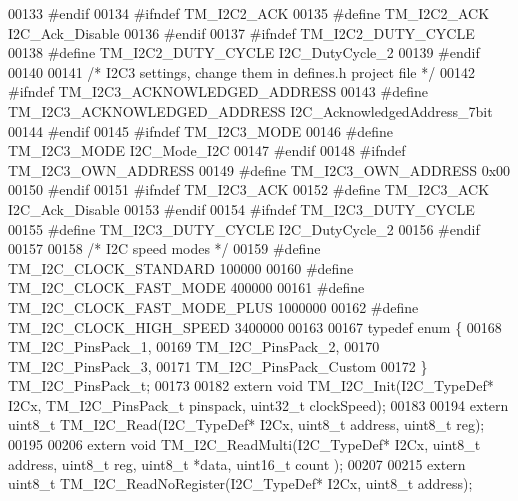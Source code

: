 \begin{DoxyCode}
00133 \textcolor{preprocessor}{#endif}
00134 \textcolor{preprocessor}{#ifndef TM\_I2C2\_ACK}
00135 \textcolor{preprocessor}{#define TM\_I2C2\_ACK                     I2C\_Ack\_Disable}
00136 \textcolor{preprocessor}{#endif}
00137 \textcolor{preprocessor}{#ifndef TM\_I2C2\_DUTY\_CYCLE}
00138 \textcolor{preprocessor}{#define TM\_I2C2\_DUTY\_CYCLE              I2C\_DutyCycle\_2}
00139 \textcolor{preprocessor}{#endif}
00140 
00141 \textcolor{comment}{/* I2C3 settings, change them in defines.h project file */}
00142 \textcolor{preprocessor}{#ifndef TM\_I2C3\_ACKNOWLEDGED\_ADDRESS}
00143 \textcolor{preprocessor}{#define TM\_I2C3\_ACKNOWLEDGED\_ADDRESS    I2C\_AcknowledgedAddress\_7bit}
00144 \textcolor{preprocessor}{#endif}
00145 \textcolor{preprocessor}{#ifndef TM\_I2C3\_MODE}
00146 \textcolor{preprocessor}{#define TM\_I2C3\_MODE                    I2C\_Mode\_I2C}
00147 \textcolor{preprocessor}{#endif}
00148 \textcolor{preprocessor}{#ifndef TM\_I2C3\_OWN\_ADDRESS}
00149 \textcolor{preprocessor}{#define TM\_I2C3\_OWN\_ADDRESS             0x00}
00150 \textcolor{preprocessor}{#endif}
00151 \textcolor{preprocessor}{#ifndef TM\_I2C3\_ACK}
00152 \textcolor{preprocessor}{#define TM\_I2C3\_ACK                     I2C\_Ack\_Disable}
00153 \textcolor{preprocessor}{#endif}
00154 \textcolor{preprocessor}{#ifndef TM\_I2C3\_DUTY\_CYCLE}
00155 \textcolor{preprocessor}{#define TM\_I2C3\_DUTY\_CYCLE              I2C\_DutyCycle\_2}
00156 \textcolor{preprocessor}{#endif}
00157 
00158 \textcolor{comment}{/* I2C speed modes */}
00159 \textcolor{preprocessor}{#define TM\_I2C\_CLOCK\_STANDARD           100000}
00160 \textcolor{preprocessor}{#define TM\_I2C\_CLOCK\_FAST\_MODE          400000}
00161 \textcolor{preprocessor}{#define TM\_I2C\_CLOCK\_FAST\_MODE\_PLUS     1000000}
00162 \textcolor{preprocessor}{#define TM\_I2C\_CLOCK\_HIGH\_SPEED         3400000}
00163 
00167 \textcolor{keyword}{typedef} \textcolor{keyword}{enum} \{
00168     TM\_I2C\_PinsPack\_1,
00169     TM\_I2C\_PinsPack\_2,
00170     TM\_I2C\_PinsPack\_3,
00171     TM\_I2C\_PinsPack\_Custom
00172 \} TM\_I2C\_PinsPack\_t;
00173 
00182 \textcolor{keyword}{extern} \textcolor{keywordtype}{void} TM\_I2C\_Init(I2C\_TypeDef* I2Cx, TM\_I2C\_PinsPack\_t pinspack, uint32\_t clockSpeed);
00183 
00194 \textcolor{keyword}{extern} uint8\_t TM\_I2C\_Read(I2C\_TypeDef* I2Cx, uint8\_t address, uint8\_t reg);
00195 
00206 \textcolor{keyword}{extern} \textcolor{keywordtype}{void} TM\_I2C\_ReadMulti(I2C\_TypeDef* I2Cx, uint8\_t address, uint8\_t reg, uint8\_t *data, uint16\_t count
      );
00207 
00215 \textcolor{keyword}{extern} uint8\_t TM\_I2C\_ReadNoRegister(I2C\_TypeDef* I2Cx, uint8\_t address);

\end{DoxyCode}
